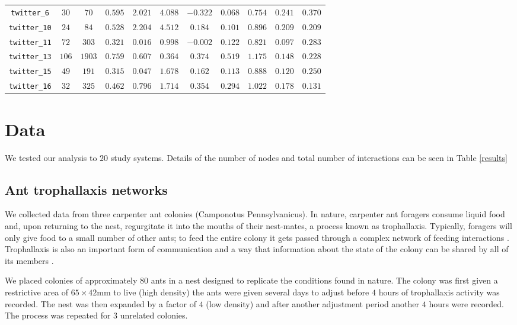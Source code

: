 \documentclass[10pt]{article}
\begin{document}
\begin{multicols}{2}
\begin{table*}[t]
\begin{tabular}{c|cccccccccc}
\verb|twitter_6| & $30$  & $70$ & $0.595$ & $2.021$ & $4.088$ & $-0.322$ & $0.068$ & $0.754$ & $0.241$ & $0.370$\\
\verb|twitter_10| & $24$ & $84$ & $0.528$ & $2.204$ & $4.512$ & $0.184$ & $0.101$ & $0.896$ & $0.209$ & $0.209$\\
\verb|twitter_11| & $72$  & $303$ & $0.321$ & $0.016$ & $0.998$ & $-0.002$ & $0.122$ & $0.821$ & $0.097$ & $0.283$\\
\verb|twitter_13| & $106$  & $1903$ & $0.759$ & $0.607$ & $0.364$ & $0.374$ & $0.519$ & $1.175$ & $0.148$ & $0.228$\\
\verb|twitter_15| & $49$  & $191$ & $0.315$ & $0.047$ & $1.678$ & $0.162$ & $0.113$ & $0.888$ & $0.120$ & $0.250$\\
\verb|twitter_16| & $32$ & $325$ & $0.462$ & $0.796$ & $1.714$ & $0.354$ & $0.294$ & $1.022$ & $0.178$ & $0.131$\\
\bottomrule
\end{tabular}
\end{table*}

\section{Data}
\label{data}
We tested our analysis to $20$ study systems. Details of the number of nodes and total number of interactions can be seen in Table \ref{results}

\subsection{Ant trophallaxis networks}
We collected data from three carpenter ant colonies (Camponotus Pennsylvanicus). In nature, carpenter ant foragers consume liquid food and, upon returning to the nest, regurgitate it into the mouths of their nest-mates, a process known as trophallaxis. Typically, foragers will only give food to a small number of other ants; to feed the entire colony it gets passed through a complex network of feeding interactions \cite{quevillon2015social}. Trophallaxis is also an important form of communication and a way that information about the state of the colony can be shared by all of its members \cite{greenwald2015ant,10.7554/eLife.20375}.

We placed colonies of approximately $80$ ants in a nest designed to replicate the conditions found in nature. The colony was first given a restrictive area of $65\times42$mm to live (high density) the ants were given several days to adjust before $4$ hours of trophallaxis activity was recorded. The nest was then expanded by a factor of $4$ (low density) and after another adjustment period another $4$ hours were recorded. The process was repeated for $3$ unrelated colonies.


\end{multicols}
\end{document}
